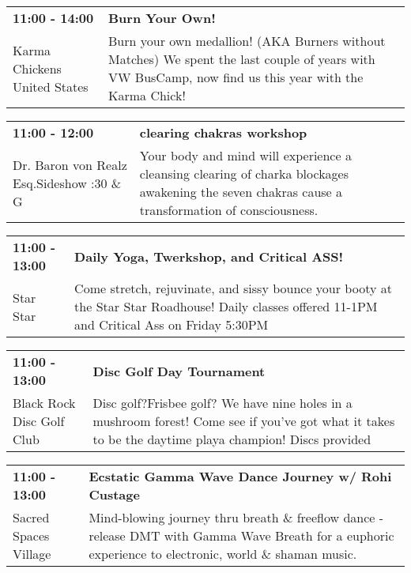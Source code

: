 \begin{tabular}{ p{1in} p{2.2in} }
    \textbf{11:00 - 14:00} & \textbf{Burn Your Own!} \\
    Karma Chickens \newline United States & Burn your own medallion! (AKA Burners without Matches) We spent the last couple of years with VW BusCamp, now find us this year with the Karma Chick! \\
    \hline 
\end{tabular}
    
\begin{tabular}{ p{1in} p{2.2in} }
    \textbf{11:00 - 12:00} & \textbf{clearing chakras workshop} \\
    Dr. Baron von Realz Esq.Sideshow \newline 4:30 \& G & Your body and mind will experience a cleansing clearing of charka blockages  awakening the seven chakras cause a transformation of consciousness. \\
    \hline 
\end{tabular}
    
\begin{tabular}{ p{1in} p{2.2in} }
    \textbf{11:00 - 13:00} & \textbf{Daily Yoga, Twerkshop, and Critical ASS!} \\
    Star Star \newline  & Come stretch, rejuvinate, and sissy bounce your booty at the Star Star Roadhouse! Daily classes offered 11-1PM and Critical Ass on Friday 5:30PM \\
    \hline 
\end{tabular}
    
\begin{tabular}{ p{1in} p{2.2in} }
    \textbf{11:00 - 13:00} & \textbf{Disc Golf Day Tournament} \\
    Black Rock Disc Golf Club \newline  & Disc golf?Frisbee golf? We have nine holes in a mushroom forest! Come see if you've got what it takes to be the daytime playa champion! Discs provided \\
    \hline 
\end{tabular}
    
\begin{tabular}{ p{1in} p{2.2in} }
    \textbf{11:00 - 13:00} & \textbf{ Ecstatic Gamma Wave Dance Journey w/ Rohi Custage} \\
    Sacred Spaces Village \newline  & Mind-blowing journey thru breath \& freeflow dance -release DMT with Gamma Wave Breath for a euphoric experience to electronic, world \& shaman music. \\
    \hline 
\end{tabular}
    

